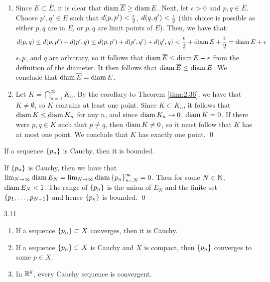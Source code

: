 \begin{nproof}
    \begin{enumerate}
        \item Since $E \subset \overline{E}$, it is clear that $\operatorname{diam} \overline{E} \geq \operatorname{diam} E$. Next, let $\epsilon > 0$ and $p, q \in \overline{E}$. Choose $p', q' \in E$ such that $d(p, p') < \frac{\epsilon}{2}$, $d(q, q') < \frac{\epsilon}{2}$ (this choice is possible as either $p, q$ are in $E$, or $p, q$ are limit points of $E$). Then, we have that:
        \begin{align*}
            d(p, q) \leq d(p, p') + d(p', q) \leq d(p, p') + d(p', q') + d(q', q) < \frac{\epsilon}{2} + \operatorname{diam} E + \frac{\epsilon}{2} = \operatorname{diam} E + \epsilon
        \end{align*}
        $\epsilon, p$, and $q$ are arbitrary, so it follows that $\operatorname{diam} \overline{E} \leq \operatorname{diam} E + \epsilon$ from the definition of the diameter. It then follows that $\operatorname{diam} \overline{E} \leq \operatorname{diam} E$. We conclude that $\operatorname{diam} \overline{E} = \operatorname{diam} E$.
        \item Let $K = \bigcap_{n=1}^\infty K_n$. By the corollary to Theorem \ref{thm:2.36}, we have that $K \neq \emptyset$, so $K$ contains at least one point. Since $K \subset K_n$, it follows that $\operatorname{diam} K \leq \operatorname{diam} K_n$ for any $n$, and since $\operatorname{diam} K_n \rightarrow 0$, $\operatorname{diam} K = 0$. If there were $p, q \in K$ such that $p \neq q$, then $\operatorname{diam} K \neq 0$, so it must follow that $K$ has at most one point. We conclude that $K$ has exactly one point. \qed
    \end{enumerate}
\end{nproof}

\begin{nlemma}{}{}
    If a sequence $\set{p_n}$ is Cauchy, then it is bounded.
\end{nlemma}
\begin{nproof}
    If $\set{p_n}$ is Cauchy, then we have that $\lim_{N \rightarrow \infty} \operatorname{diam} E_N = \lim_{N \rightarrow \infty} \operatorname{diam} \set{p_n}_{n = N}^\infty = 0$. Then for some $N \in \mathbb{N}$, $\operatorname{diam} E_N < 1$. The range of $\set{p_n}$ is the union of $E_N$ and the finite set $\set{p_1, \ldots, p_{N-1}}$ and hence $\set{p_n}$ is bounded. \qed
\end{nproof}

\begin{theorem}{}{3.11}
    \begin{enumerate}
        \item If a sequence $\set{p_n} \subset X$ converges, then it is Cauchy.
        \item If a sequence $\set{p_n} \subset X$ is Cauchy and $X$ is compact, then $\set{p_n}$ converges to some $p \in X$.
        \item In $\mathbb{R}^k$, every Cauchy sequence is convergent.
    \end{enumerate}
\end{theorem}

